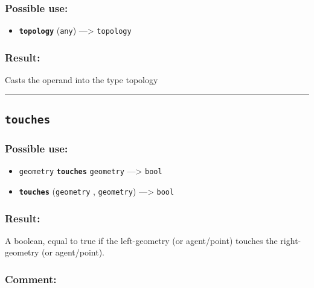 \documentclass[]{book}
\providecommand{\tightlist}{%
  \setlength{\itemsep}{0pt}\setlength{\parskip}{0pt}}
\theoremstyle{definition}
\theoremstyle{definition}
\theoremstyle{definition}
\theoremstyle{remark}
\begin{document}
\subsubsection{Possible use:}\label{possible-use-526}

\begin{itemize}
\tightlist
\item
  \textbf{\texttt{topology}} (\texttt{any}) ---\textgreater{}
  \texttt{topology}
\end{itemize}

\subsubsection{Result:}\label{result-508}

Casts the operand into the type topology

\begin{center}\rule{0.5\linewidth}{\linethickness}\end{center}

\subsection{\texorpdfstring{\texttt{touches}}{touches}}\label{touches}

\subsubsection{Possible use:}\label{possible-use-527}

\begin{itemize}
\tightlist
\item
  \texttt{geometry} \textbf{\texttt{touches}} \texttt{geometry}
  ---\textgreater{} \texttt{bool}
\item
  \textbf{\texttt{touches}} (\texttt{geometry} , \texttt{geometry})
  ---\textgreater{} \texttt{bool}
\end{itemize}

\subsubsection{Result:}\label{result-509}

A boolean, equal to true if the left-geometry (or agent/point) touches
the right-geometry (or agent/point).

\subsubsection{Comment:}\label{comment-100}
\end{document}
